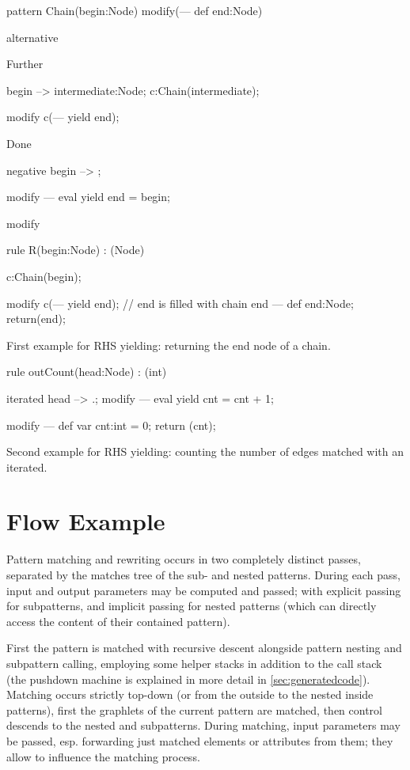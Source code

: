 \begin{example}
  \begin{grgen}
pattern Chain(begin:Node) modify(--- def end:Node)
{
  alternative {
    Further {
      begin --> intermediate:Node;
      c:Chain(intermediate);
      
      modify {
        c(--- yield end);
      }
    }
    Done {
      negative {
        begin --> ;
      }
      
      modify {
      ---
        eval {
          yield end = begin;
        }
      }
    }
  }
  
  modify { }
}

rule R(begin:Node) : (Node) {
  c:Chain(begin);

  modify {
    c(--- yield end); // end is filled with chain end
  ---
    def end:Node;
    return(end);
  }
}
  \end{grgen}
  First example for RHS yielding: returning the end node of a chain.
\end{example}

\begin{example}
  \begin{grgen}
rule outCount(head:Node) : (int)
{
  iterated {
    head --> .;
    modify {
    ---
      eval { yield cnt = cnt + 1; }
    }
  }

  modify {
  ---
    def var cnt:int = 0;
    return (cnt);
  }
}
  \end{grgen}
  Second example for RHS yielding: counting the number of edges matched with an iterated.
\end{example}



\section{Flow Example}\label{matchingflow}

Pattern matching and rewriting occurs in two completely distinct passes, separated by the matches tree of the sub- and nested patterns.
During each pass, input and output parameters may be computed and passed; with explicit passing for subpatterns, and implicit passing for nested patterns (which can directly access the content of their contained pattern).

First the pattern is matched with recursive descent alongside pattern nesting and subpattern calling, employing some helper stacks in addition to the call stack (the pushdown machine is explained in more detail in \ref{sec:generatedcode}).
Matching occurs strictly top-down (or from the outside to the nested inside patterns), first the graphlets of the current pattern are matched, then control descends to the nested and subpatterns.
During matching, input parameters may be passed, esp. forwarding just matched elements or attributes from them; they allow to influence the matching process.

